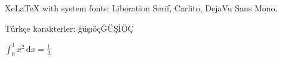 \documentclass{article}
\begin{document}
XeLaTeX with system fonts: Liberation Serif, {\sffamily Carlito}, {\ttfamily DejaVu Sans Mono}.
\begin{turkish}Türkçe karakterler: ğüşıöçĞÜŞİÖÇ\end{turkish}
$\int_0^1 x^2\,\mathrm{d}x = \tfrac{1}{3}$
\end{document}

